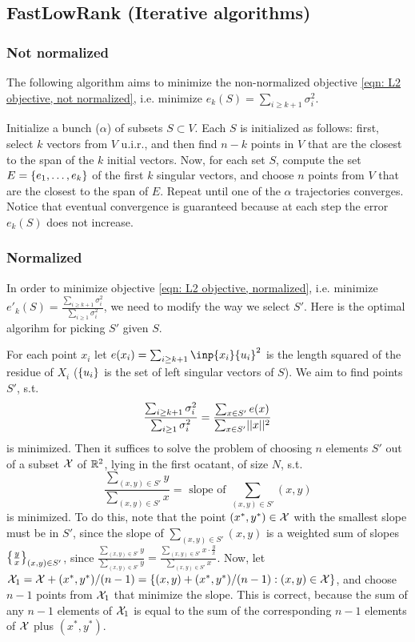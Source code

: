 \documentclass{article}
\begin{document}
\subsection{FastLowRank (Iterative algorithms)}
\subsubsection{Not normalized}\label{alg: FastLowRank, not normalized}
The following algorithm aims to minimize the non-normalized objective \ref{eqn: L2 objective, not normalized}, i.e. minimize $e_k(S) = \sum_{i\geq k+1}\sigma_i^2$.

Initialize a bunch ($\alpha$) of subsets $S\subset V$. Each $S$ is initialized as follows: first, select $k$ vectors from $V$ u.i.r., and then find $n-k$ points in $V$ that are the closest to the span of the $k$ initial vectors. Now, for each set $S$, compute the set $E = \left\{e_1,\dots, e_k\right\}$ of the first $k$ singular vectors, and choose $n$ points from $V$ that are the closest to the span of $E$. Repeat until one of the $\alpha$ trajectories converges. Notice that eventual convergence is guaranteed because at each step the error $e_k(S)$ does not increase.

\subsubsection{Normalized}\label{alg: FastLowRank, normalized}
In order to minimize objective \ref{eqn: L2 objective, normalized}, i.e. minimize $e'_k(S) = \frac{\sum_{i\geq k+1}\sigma_i^2}{\sum_{i\geq 1}\sigma_i^2}$, we need to modify the way we select $S'$. Here is the optimal algorihm for picking $S'$ given $S$.

For each point $x_i$ let $e(x_i) = \sum_{i\geq k+1}\inp{x_i}{u_i}^2$ is the length squared of the residue of $X_i$ ($\left\{u_i\right\}$ is the set of left singular vectors of $S$). We aim to find points $S'$, s.t.
 $$\frac{\sum_{i\geq k+1}\sigma_i^2}{\sum_{i\geq 1}\sigma_i^2} = \frac{\sum_{x \in S'}e(x)}{\sum_{x\in S'}\norm{x}^2}$$
 is minimized. Then it suffices to solve the problem of choosing $n$ elements $S'$ out of a subset $\mathcal{X}$ of $\mathbb{R}^2$, lying in the first ocatant, of size $N$, s.t. $$\frac{\sum_{(x,y) \in S'}y}{\sum_{(x,y)\in S'}x} = \text{ slope of }\sum_{(x,y) \in S'}(x,y)$$ is minimized. To do this, note that the point $(x^*,y^*) \in \mathcal{X}$ with the smallest slope must be in $S'$, since the slope of
  $\sum_{(x,y) \in S'}(x,y)$ is a weighted sum of slopes $\left\{\frac{y}{x}\right\}_{(x,y)\in S'}$, since $\frac{\sum_{(x,y) \in S'}y}{\sum_{(x,y)\in S'}y} = \frac{\sum_{(x,y) \in S'}x\cdot \frac{y}{x}}{\sum_{(x,y)\in S'}x}$.
  Now, let $\mathcal{X}_1 = \mathcal{X} + (x^*,y^*)/(n-1) = \left\{(x,y) + (x^*,y^*)/(n-1): (x,y)\in \mathcal{X}\right\}$, and choose $n-1$ points from $\mathcal{X}_1$ that minimize the slope. This is correct, because the sum of any $n-1$ elements of $\mathcal{X}_1$ is equal to the sum of the corresponding $n-1$ elements of $\mathcal{X}$ plus $(x^*, y^*)$.
\end{document}
